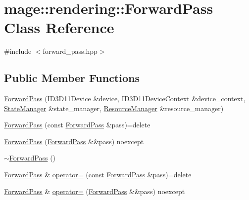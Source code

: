 \hypertarget{classmage_1_1rendering_1_1_forward_pass}{}\section{mage\+:\+:rendering\+:\+:Forward\+Pass Class Reference}
\label{classmage_1_1rendering_1_1_forward_pass}


{\ttfamily \#include $<$forward\+\_\+pass.\+hpp$>$}

\subsection*{Public Member Functions}
\begin{DoxyCompactItemize}
\item 
\mbox{\hyperlink{classmage_1_1rendering_1_1_forward_pass_aabff6394203f0927f65cd9d591eefa58}{Forward\+Pass}} (I\+D3\+D11\+Device \&device, I\+D3\+D11\+Device\+Context \&device\+\_\+context, \mbox{\hyperlink{classmage_1_1rendering_1_1_state_manager}{State\+Manager}} \&state\+\_\+manager, \mbox{\hyperlink{classmage_1_1rendering_1_1_resource_manager}{Resource\+Manager}} \&resource\+\_\+manager)
\item 
\mbox{\hyperlink{classmage_1_1rendering_1_1_forward_pass_a5454d208d794e9ef2ae05c03e7b839fd}{Forward\+Pass}} (const \mbox{\hyperlink{classmage_1_1rendering_1_1_forward_pass}{Forward\+Pass}} \&pass)=delete
\item 
\mbox{\hyperlink{classmage_1_1rendering_1_1_forward_pass_a5f7026d7b4a439bdbacfeaf8fff152c1}{Forward\+Pass}} (\mbox{\hyperlink{classmage_1_1rendering_1_1_forward_pass}{Forward\+Pass}} \&\&pass) noexcept
\item 
\mbox{\hyperlink{classmage_1_1rendering_1_1_forward_pass_a9fdcc7dca5097f0feff2f7be92a2727c}{$\sim$\+Forward\+Pass}} ()
\item 
\mbox{\hyperlink{classmage_1_1rendering_1_1_forward_pass}{Forward\+Pass}} \& \mbox{\hyperlink{classmage_1_1rendering_1_1_forward_pass_a373b424f52fb5a209bed756dc06f47ee}{operator=}} (const \mbox{\hyperlink{classmage_1_1rendering_1_1_forward_pass}{Forward\+Pass}} \&pass)=delete
\item 
\mbox{\hyperlink{classmage_1_1rendering_1_1_forward_pass}{Forward\+Pass}} \& \mbox{\hyperlink{classmage_1_1rendering_1_1_forward_pass_aba2191f3e482d2fb0db2ad2cab77c817}{operator=}} (\mbox{\hyperlink{classmage_1_1rendering_1_1_forward_pass}{Forward\+Pass}} \&\&pass) noexcept
\item 

\end{DoxyCompactItemize}
